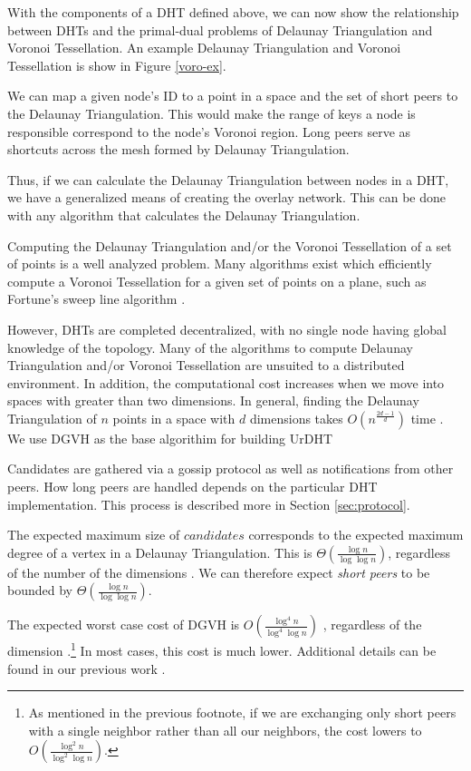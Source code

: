 With the components of a DHT defined above, we can now show the relationship between DHTs and the primal-dual problems of Delaunay Triangulation and Voronoi Tessellation.
An example Delaunay Triangulation and Voronoi Tessellation is show in Figure \ref{voro-ex}.

We can map a given node's ID to a point in a space and the set of short peers to the Delaunay Triangulation.
This would make the range of keys a node is responsible correspond to the node's Voronoi region.
Long peers serve as shortcuts across the mesh formed by Delaunay Triangulation.


Thus, if we can calculate the Delaunay Triangulation between nodes in a DHT, we have a generalized means of creating the overlay network.
This can be done with any algorithm that calculates the Delaunay Triangulation.

Computing the Delaunay Triangulation and/or the Voronoi Tessellation of a set of points is a well analyzed problem.
Many algorithms exist which efficiently compute a Voronoi Tessellation for a given set of points on a plane, such as Fortune's sweep line algorithm \cite{fortune1987sweepline}.

However, DHTs are completed decentralized, with no single node having global knowledge of the topology.
Many of the algorithms to compute Delaunay Triangulation and/or Voronoi Tessellation are unsuited to a distributed environment.
In addition, the computational cost increases when we move into spaces with greater than two dimensions.
In general, finding the Delaunay Triangulation of $n$ points in a space with $d$ dimensions takes $O(n^{\frac{2d-1}{d}})$ time \cite{watson1981computing}.
We use DGVH as the base algorithim for building UrDHT

Candidates are gathered via a gossip protocol as well as notifications from other peers.
How long peers are handled depends on the particular DHT implementation.
This process is described more in Section \ref{sec:protocol}.

The expected maximum size of $ candidates $ corresponds to the expected maximum degree of a vertex in a Delaunay Triangulation.
This is  $\Theta(\frac{\log n}{\log \log n} )$, regardless of the number of the dimensions \cite{bern1991expected}. 
We can therefore expect \textit{short peers} to be bounded by $\Theta(\frac{\log n}{\log \log n})$.

The expected worst case cost of DGVH is \(O(\frac{\log^{4} n}{\log^{4} \log n} )\) \cite{dgvh}, regardless of the dimension \cite{dgvh}.\footnote{As mentioned in the previous footnote, if we are exchanging only short peers with a single neighbor rather than all our neighbors, the cost lowers to \(O(\frac{\log^{2} n}{\log^{2} \log n} )\).}
In most cases, this cost is much lower.
Additional details can be found in our previous work \cite{dgvh}.




